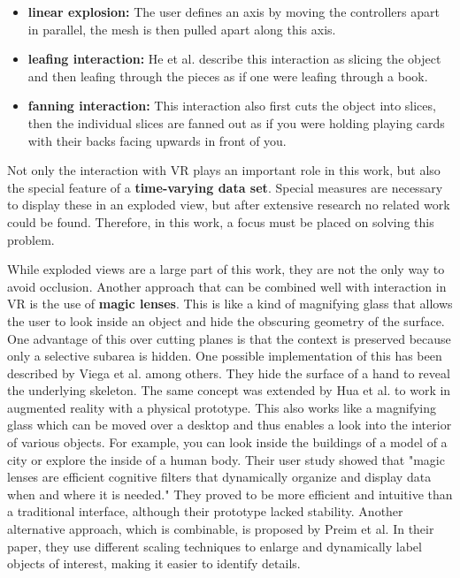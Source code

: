\begin{itemize}
	\item \textbf{linear explosion:} The user defines an axis by moving the controllers apart in parallel, the mesh is then pulled apart along this axis.
	\item \textbf{leafing interaction:} He et al. describe this interaction as slicing the object and then leafing through the pieces as if one were leafing through a book.
	\item \textbf{fanning interaction:} This interaction also first cuts the object into slices, then the individual slices are fanned out as if you were holding playing cards with their backs facing upwards in front of you. 
\end{itemize}

Not only the interaction with VR plays an important role in this work, but also the special feature of a \textbf{time-varying data set}. 
Special measures are necessary to display these in an exploded view, but after extensive research no related work could be found. 
Therefore, in this work, a focus must be placed on solving this problem.

While exploded views are a large part of this work, they are not the only way to avoid occlusion. 
Another approach that can be combined well with interaction in VR is the use of \textbf{magic lenses}.
This is like a kind of magnifying glass that allows the user to look inside an object and hide the obscuring geometry of the surface.
One advantage of this over cutting planes is that the context is preserved because only a selective subarea is hidden.   
One possible implementation of this has been described by Viega et al. among others.\cite{Viega_1996}
They hide the surface of a hand to reveal the underlying skeleton. %
The same concept was extended by Hua et al. to work in augmented reality with a physical prototype.\cite{Hua_2006}
This also works like a magnifying glass which can be moved over a desktop and thus enables a look into the interior of various objects. 
For example, you can look inside the buildings of a model of a city or explore the inside of a human body.
Their user study showed that "magic lenses are efficient cognitive filters that dynamically organize and display data when and where it is needed."\cite{Hua_2006}
They proved to be more efficient and intuitive than a traditional interface, although their prototype lacked stability.
Another alternative approach, which is combinable, is proposed by Preim et al. In their paper, they use different scaling techniques to enlarge and dynamically label objects of interest, making it easier to identify details.\cite{Preim_1997}

